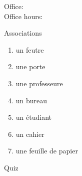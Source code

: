 \documentclass{beamer}
\subtitle[À la fac]{À la fac}
\begin{document}
  \begin{frame}
    \titlepage
    \tiny{Office: \\
          Office hours: }
  \end{frame}


  \begin{frame}{Associations }
    \begin{enumerate}
      \item un feutre
      \item une porte
      \item une professeure
      \item un bureau
      \item un étudiant
      \item un cahier
      \item une feuille de papier
    \end{enumerate}
  \end{frame}

  \begin{frame}{}
    \begin{center}
      \Large Quiz
    \end{center}
  \end{frame}
\end{document}

